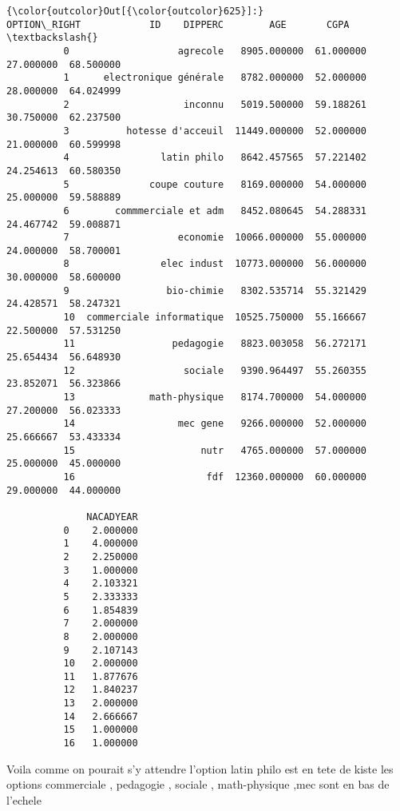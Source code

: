 \documentclass[11pt]{article}
\begin{document}
            \begin{Verbatim}[commandchars=\\\{\}]
{\color{outcolor}Out[{\color{outcolor}625}]:}                 OPTION\_RIGHT            ID    DIPPERC        AGE       CGPA  \textbackslash{}
          0                   agrecole   8905.000000  61.000000  27.000000  68.500000   
          1      electronique générale   8782.000000  52.000000  28.000000  64.024999   
          2                    inconnu   5019.500000  59.188261  30.750000  62.237500   
          3          hotesse d'acceuil  11449.000000  52.000000  21.000000  60.599998   
          4                latin philo   8642.457565  57.221402  24.254613  60.580350   
          5              coupe couture   8169.000000  54.000000  25.000000  59.588889   
          6        commmerciale et adm   8452.080645  54.288331  24.467742  59.008871   
          7                   economie  10066.000000  55.000000  24.000000  58.700001   
          8                elec indust  10773.000000  56.000000  30.000000  58.600000   
          9                 bio-chimie   8302.535714  55.321429  24.428571  58.247321   
          10  commerciale informatique  10525.750000  55.166667  22.500000  57.531250   
          11                 pedagogie   8823.003058  56.272171  25.654434  56.648930   
          12                   sociale   9390.964497  55.260355  23.852071  56.323866   
          13             math-physique   8174.700000  54.000000  27.200000  56.023333   
          14                  mec gene   9266.000000  52.000000  25.666667  53.433334   
          15                      nutr   4765.000000  57.000000  25.000000  45.000000   
          16                       fdf  12360.000000  60.000000  29.000000  44.000000   
          
              NACADYEAR  
          0    2.000000  
          1    4.000000  
          2    2.250000  
          3    1.000000  
          4    2.103321  
          5    2.333333  
          6    1.854839  
          7    2.000000  
          8    2.000000  
          9    2.107143  
          10   2.000000  
          11   1.877676  
          12   1.840237  
          13   2.000000  
          14   2.666667  
          15   1.000000  
          16   1.000000  
\end{Verbatim}
        
    Voila comme on pourait s'y attendre l'option latin philo est en tete de
kiste les options commerciale , pedagogie , sociale , math-physique ,mec
sont en bas de l'echele
\end{document}
